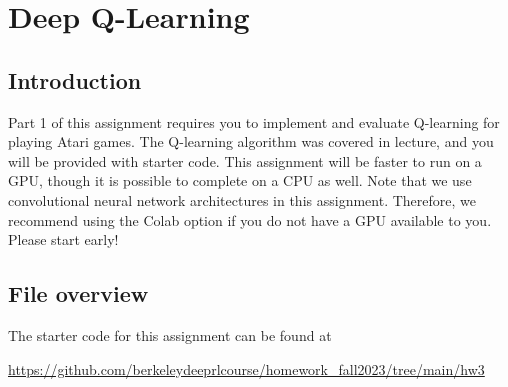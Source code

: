 \section{Deep Q-Learning}
\subsection{Introduction}

Part 1 of this assignment requires you to implement and evaluate Q-learning for playing Atari games. The Q-learning algorithm was covered in lecture, and you will be provided with starter code. This assignment will be faster to run on a GPU, though it is possible to complete on a CPU as well. Note that we use convolutional neural network architectures in this assignment. Therefore, we recommend using the Colab option if you do not have a GPU available to you. Please start early!


\subsection{File overview}
The starter code for this assignment can be found at

\begin{centering}
\url{https://github.com/berkeleydeeprlcourse/homework_fall2023/tree/main/hw3} \\
\end{centering}
\vspace{.35cm}

